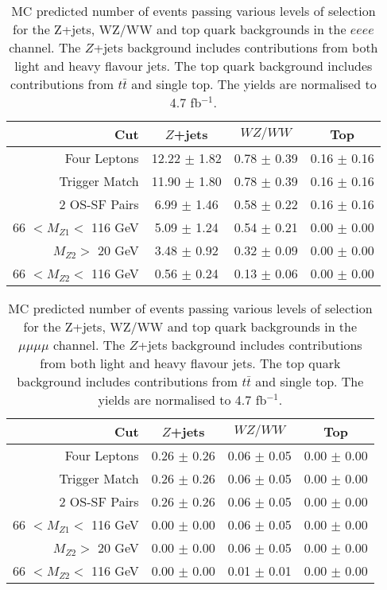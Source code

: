 \begin{table}[htbp]
  \centering
  \begin{tabular}{r|c|c|c} 
    \hline\hline
                 Cut &               $Z$+jets &             $WZ/WW$ &               Top\\ 
    \hline
        Four Leptons &  12.22 $\pm$ 1.82 & 0.78 $\pm$ 0.39 & 0.16 $\pm$ 0.16 \\ 
       Trigger Match &  11.90 $\pm$ 1.80 & 0.78 $\pm$ 0.39 & 0.16 $\pm$ 0.16 \\ 
       2 OS-SF Pairs &  6.99 $\pm$ 1.46 & 0.58 $\pm$ 0.22 & 0.16 $\pm$ 0.16 \\ 
66 $ < M_{Z1} < $ 116 GeV &  5.09 $\pm$ 1.24 & 0.54 $\pm$ 0.21 & 0.00 $\pm$ 0.00 \\ 
  $M_{Z2} > $ 20 GeV &  3.48 $\pm$ 0.92 & 0.32 $\pm$ 0.09 & 0.00 $\pm$ 0.00 \\ 
66 $ < M_{Z2} < $ 116 GeV &  0.56 $\pm$ 0.24 & 0.13 $\pm$ 0.06 & 0.00 $\pm$ 0.00 \\ 
    \hline\hline
  \end{tabular}
  \caption{MC predicted number of events passing various levels of selection for the Z+jets, WZ/WW and top quark backgrounds in the $eeee$ channel. The $Z$+jets background includes contributions from both light and heavy flavour jets. The top quark background includes contributions from $t\bar t$ and single top. The yields are normalised to 4.7 fb$^{-1}$.
}
  \label{table:mc-bg-4e}
\end{table}

\begin{table}[htbp]
  \centering
  \begin{tabular}{r|c|c|c} 
    \hline\hline
                 Cut &               $Z$+jets &             $WZ/WW$ &               Top\\ 
    \hline

        Four Leptons &  0.26 $\pm$ 0.26 & 0.06 $\pm$ 0.05 & 0.00 $\pm$ 0.00 \\ 
       Trigger Match &  0.26 $\pm$ 0.26 & 0.06 $\pm$ 0.05 & 0.00 $\pm$ 0.00 \\ 
       2 OS-SF Pairs &  0.26 $\pm$ 0.26 & 0.06 $\pm$ 0.05 & 0.00 $\pm$ 0.00 \\ 
66 $ < M_{Z1} < $ 116 GeV &  0.00 $\pm$ 0.00 & 0.06 $\pm$ 0.05 & 0.00 $\pm$ 0.00 \\ 
  $M_{Z2} > $ 20 GeV &  0.00 $\pm$ 0.00 & 0.06 $\pm$ 0.05 & 0.00 $\pm$ 0.00 \\ 
66 $ < M_{Z2} < $ 116 GeV &  0.00 $\pm$ 0.00 & 0.01 $\pm$ 0.01 & 0.00 $\pm$ 0.00 \\ 
    \hline\hline
  \end{tabular}
  \caption{MC predicted number of events passing various levels of selection for the Z+jets, WZ/WW and top quark backgrounds in the $\mu\mu\mu\mu$ channel. The $Z$+jets background includes contributions from both light and heavy flavour jets. The top quark background includes contributions from $t\bar t$ and single top. The yields are normalised to 4.7 fb$^{-1}$.
}
  \label{table:mc-bg-4mu}
\end{table}

